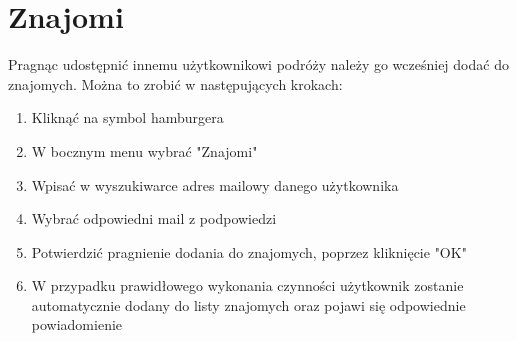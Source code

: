 \documentclass[10pt,twoside,a4paper]{report}
\begin{document}
\section{Znajomi}
Pragnąc udostępnić innemu użytkownikowi podróży należy go wcześniej dodać do znajomych. Można to zrobić w następujących krokach:
\begin{enumerate}
\item Kliknąć na symbol hamburgera
\item W bocznym menu wybrać "Znajomi"
\item Wpisać w wyszukiwarce adres mailowy danego użytkownika
\item Wybrać odpowiedni mail z podpowiedzi 
\item Potwierdzić pragnienie dodania do znajomych, poprzez kliknięcie "OK"
\item W przypadku prawidłowego wykonania czynności użytkownik zostanie automatycznie dodany do listy znajomych oraz pojawi się odpowiednie powiadomienie
\end{enumerate}
\end{document}
